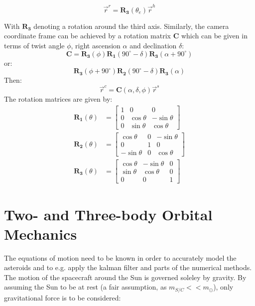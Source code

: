\documentclass[a4paper,10pt]{article}
\begin{document}
\begin{equation}
 \vec{r}^r = \mathbf{R_3}(\theta_e) \vec{r}^h
\end{equation}

With $\mathbf{R_3}$ denoting a rotation around the third axis. Similarly, the camera coordinate frame can be achieved by a rotation matrix $\mathbf{C}$ which can be given in terms of twist angle $\phi$, right ascension $\alpha$ and declination $\delta$:
\begin{equation}
 \mathbf{C} = \mathbf{R_3}(\phi)\mathbf{R_1}(90^\circ - \delta)\mathbf{R_3}(\alpha + 90^\circ)
\end{equation}
or:
\begin{equation}
 \mathbf{R_3}(\phi + 90^\circ)\mathbf{R_2}(90^\circ - \delta)\mathbf{R_3}(\alpha)
\end{equation}
Then:
\begin{equation}
 \vec{r}^c = \mathbf{C}(\alpha, \delta, \phi)\vec{r}^s
\end{equation}
The rotation matrices are given by:
\begin{align}
 \mathbf{R_1}(\theta) &= \begin{bmatrix}1 & 0 & 0 \\ 0 & \cos \theta & -\sin \theta \\ 0 & \sin \theta & \cos \theta \end{bmatrix} \\
 \mathbf{R_2}(\theta) &= \begin{bmatrix} \cos \theta & 0 & - \sin \theta \\ 0 & 1 & 0 \\ - \sin \theta & 0 & \cos \theta \end{bmatrix} \\
 \mathbf{R_3}(\theta) &= \begin{bmatrix} \cos \theta & -\sin \theta & 0 \\ \sin \theta & \cos \theta & 0 \\ 0 & 0 & 1 \end{bmatrix}
\end{align}







\section{Two- and Three-body Orbital Mechanics}

The equations of motion need to be known in order to accurately model the asteroids and to e.g. apply the kalman filter and parts of the numerical methods. The motion of the spacecraft around the Sun is governed soleley by gravity. By assuming the Sun to be at rest (a fair assumption, as $m_{S/C} << m_\odot$), only gravitational force is to be considered:
\end{document}
